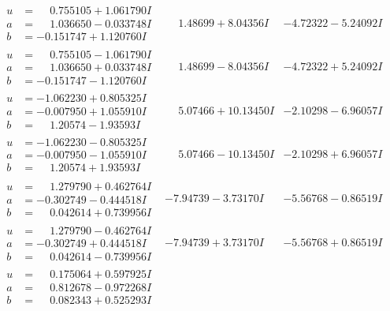 \documentclass[1p]{elsarticle_modified}
\theoremstyle{definition}
\begin{document}
$$\begin{array}{c|c|c}
\begin{aligned}
u &= \phantom{-}0.755105 + 1.061790 I \\
a &= \phantom{-}1.036650 - 0.033748 I \\
b &= -0.151747 + 1.120760 I\end{aligned}
 & \phantom{-}1.48699 + 8.04356 I & -4.72322 - 5.24092 I \\ \hline\begin{aligned}
u &= \phantom{-}0.755105 - 1.061790 I \\
a &= \phantom{-}1.036650 + 0.033748 I \\
b &= -0.151747 - 1.120760 I\end{aligned}
 & \phantom{-}1.48699 - 8.04356 I & -4.72322 + 5.24092 I \\ \hline\begin{aligned}
u &= -1.062230 + 0.805325 I \\
a &= -0.007950 + 1.055910 I \\
b &= \phantom{-}1.20574 - 1.93593 I\end{aligned}
 & \phantom{-}5.07466 + 10.13450 I & -2.10298 - 6.96057 I \\ \hline\begin{aligned}
u &= -1.062230 - 0.805325 I \\
a &= -0.007950 - 1.055910 I \\
b &= \phantom{-}1.20574 + 1.93593 I\end{aligned}
 & \phantom{-}5.07466 - 10.13450 I & -2.10298 + 6.96057 I \\ \hline\begin{aligned}
u &= \phantom{-}1.279790 + 0.462764 I \\
a &= -0.302749 - 0.444518 I \\
b &= \phantom{-}0.042614 + 0.739956 I\end{aligned}
 & -7.94739 - 3.73170 I & -5.56768 - 0.86519 I \\ \hline\begin{aligned}
u &= \phantom{-}1.279790 - 0.462764 I \\
a &= -0.302749 + 0.444518 I \\
b &= \phantom{-}0.042614 - 0.739956 I\end{aligned}
 & -7.94739 + 3.73170 I & -5.56768 + 0.86519 I \\ \hline\begin{aligned}
u &= \phantom{-}0.175064 + 0.597925 I \\
a &= \phantom{-}0.812678 - 0.972268 I \\
b &= \phantom{-}0.082343 + 0.525293 I\end{aligned}

\end{array}$$
\end{document}
